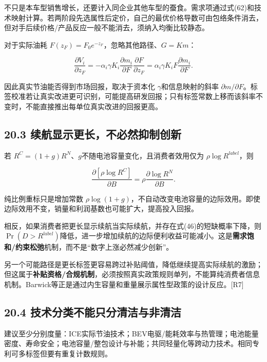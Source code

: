\documentclass[
  11pt,
]{article}
\begin{document}
不只是本车型销售增长，还要计入同企业其他车型的蚕食。需求项通过式(62)和技术映射计算。若两阶段先选属性后定价，自己的最优价格导数可由包络条件消去，但对手后续价格/产品反应一般不能消去，须纳入均衡比较静态。

对于实际油耗 \(F(z_F)=F_0e^{-z_F}\)，忽略其他路径、\(G=Km\)：

\[
\frac{\partial V_i}{\partial z_F}
=-\alpha_i\gamma K_i\frac{\partial m_i}{\partial F}\frac{\partial F}{\partial z_F}
=\alpha_i\gamma K_iF\frac{\partial m_i}{\partial F}.
\tag{90}
\]

因此真实节油能否得到市场回报，取决于资本化 \(\gamma\)和信息映射的斜率
\(\partial m/\partial F\)。标签校准若让真实改进更可识别，可能提高研发回报；只有标签常数上移而该斜率不变时，不能直接推出每单位真实改进的回报更高。

\subsection{20.3
续航显示更长，不必然抑制创新}\label{ux7eedux822aux663eux793aux66f4ux957fux4e0dux5fc5ux7136ux6291ux5236ux521bux65b0}

若 \(R^{C}=(1+g)R^{N}\)、\(g\)不随电池容量变化，且消费者效用仅为
\(\rho\log R^{label}\)，则

\[
\frac{\partial[\rho\log R^{C}]}{\partial B}
=\rho\frac{\partial\log R^{N}}{\partial B}.
\tag{91}
\]

纯比例重标只是增加常数
\(\rho\log(1+g)\)，不自动改变电池容量的边际效用。即使边际效用不变，销量和利润基数也可能扩大，提高投入回报。

相反，如果消费者把更长显示续航当实际续航，并存在式(46)的短缺概率下降，则
\(\Pr(D>R^{label})\)降低，进一步增加续航的边际便利收益可能减小。这是\textbf{需求饱和/约束松弛}机制，而不是``数字上涨必然减少创新''。

另一个可能路径是更长标签更容易跨过补贴阈值，降低继续提高实际续航的激励；但这属于\textbf{补贴资格/合规机制}，必须按照真实政策规则单列，不能算纯消费者信息机制。Barwick等正是通过内生容量和重量展示属性型政策的设计反应。{[}R7{]}

\subsection{20.4
技术分类不能只分清洁与非清洁}\label{ux6280ux672fux5206ux7c7bux4e0dux80fdux53eaux5206ux6e05ux6d01ux4e0eux975eux6e05ux6d01}

建议至少分别度量：ICE实际节油技术；BEV电驱/能耗效率与热管理；电池能量密度、寿命安全；电池容量/整包设计与补能；共同轻量化等跨动力技术。相同专利可多标签但要有重复计数规则。
\end{document}
